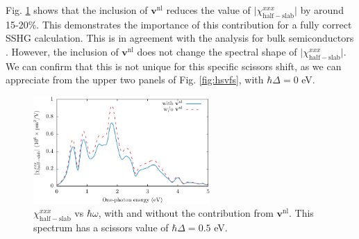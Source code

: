 Fig. \ref{fig:vnl} shows that the inclusion of $\mathbf{v}^\mathrm{nl}$ reduces
the value of $\vert\chi^{xxx}_{\mathrm{half-slab}}\vert$ by around 15-20\%. This
demonstrates the importance of this contribution for a fully correct SSHG
calculation. This is in agreement with the analysis for bulk semiconductors
\cite{luppiPRB08}. However, the inclusion of $\mathbf{v}^\mathrm{nl}$ does not
change the spectral shape of $\vert\chi^{xxx}_{\mathrm{half-slab}}\vert$. We can
confirm that this is not unique for this specific scissors shift, as we can
appreciate from the upper two panels of Fig. \ref{fig:hsvfs}, with $\hbar\Delta
= 0$ eV.

\begin{figure}[b]
\centering 
\includegraphics[width=0.6\textwidth]{content/figures/fig-Si2x1-vnl}
\caption[$\chi^{xxx}_{\mathrm{half-slab}}$ with and without
$\mathbf{v}^\mathrm{nl}$]
{$\chi^{xxx}_{\mathrm{half-slab}}$ vs $\hbar\omega$, with and without
the contribution from $\mathbf{v}^\mathrm{nl}$. This spectrum has a scissors
value of $\hbar\Delta=0.5$ eV.}
\label{fig:vnl}
\end{figure}


